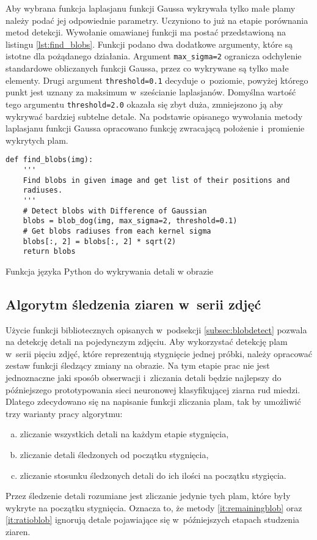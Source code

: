 Aby wybrana funkcja laplasjanu funkcji Gaussa wykrywała tylko małe plamy
należy podać jej odpowiednie parametry.
Uczyniono to już na etapie porównania metod detekcji.
Wywołanie omawianej funkcji ma postać przedstawioną na listingu
\ref{lst:find_blobs}.
Funkcji podano dwa dodatkowe argumenty, które są istotne dla pożądanego
działania.
Argument \texttt{max_sigma=2} ogranicza odchylenie standardowe
obliczanych funkcji Gaussa, przez co wykrywane są tylko małe elementy.
Drugi argument \texttt{threshold=0.1} decyduje o~poziomie,
powyżej którego punkt jest uznany za maksimum w~sześcianie laplasjanów.
Domyślna wartość tego argumentu \texttt{threshold=2.0} okazała 
się zbyt duża, zmniejszono ją aby wykrywać bardziej subtelne detale.
Na podstawie opisanego wywołania metody laplasjanu funkcji Gaussa
opracowano funkcję zwracającą położenie i~promienie wykrytych plam.
\begin{listing}[htb]
\begin{verbatim}
def find_blobs(img):
    '''
    Find blobs in given image and get list of their positions and 
    radiuses.
    '''
    # Detect blobs with Difference of Gaussian
    blobs = blob_dog(img, max_sigma=2, threshold=0.1)
    # Get blobs radiuses from each kernel sigma
    blobs[:, 2] = blobs[:, 2] * sqrt(2)
    return blobs
\end{verbatim}
\caption{Funkcja języka Python do wykrywania detali w obrazie}
\label{lst:find_blobs}
\end{listing}

\subsection{Algorytm śledzenia ziaren w~serii zdjęć}
\label{subsec:blobtracking}
Użycie funkcji bibliotecznych opisanych w~podsekcji \ref{subsec:blobdetect}
pozwala na detekcję detali na pojedynczym zdjęciu.
Aby wykorzystać detekcję plam w~serii pięciu zdjęć, które reprezentują
stygnięcie jednej próbki, należy opracować zestaw funkcji śledzący zmiany 
na obrazie.
Na tym etapie prac nie jest jednoznaczne jaki sposób obserwacji i~zliczania
detali będzie najlepszy do późniejszego prototypowania sieci neuronowej
klasyfikującej ziarna rud miedzi.
Dlatego zdecydowano się na napisanie funkcji zliczania plam, tak by umożliwić
trzy warianty pracy algorytmu:
\begin{enumerate}[a)]
	\item \label{it:allblob}
	      zliczanie wszystkich detali na każdym etapie stygnięcia,
	\item \label{it:remainingblob}
	      zliczanie detali śledzonych od początku stygnięcia,
	\item \label{it:ratioblob}
	      zliczanie stosunku śledzonych detali do ich ilości na początku
	      stygięcia.
\end{enumerate}
Przez śledzenie detali rozumiane jest zliczanie jedynie tych plam, które
były wykryte na początku stygnięcia.
Oznacza to, że metody \ref{it:remainingblob} oraz \ref{it:ratioblob}
ignorują detale pojawiające się w~późniejszych etapach studzenia ziaren.

